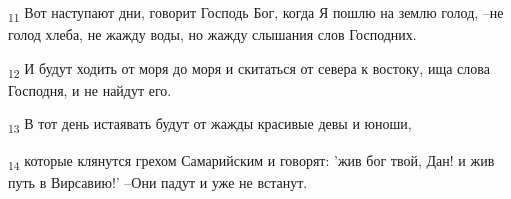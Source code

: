 \begin{tcolorbox}
\textsubscript{11} Вот наступают дни, говорит Господь Бог, когда Я пошлю на землю голод, --не голод хлеба, не жажду воды, но жажду слышания слов Господних.
\end{tcolorbox}
\begin{tcolorbox}
\textsubscript{12} И будут ходить от моря до моря и скитаться от севера к востоку, ища слова Господня, и не найдут его.
\end{tcolorbox}
\begin{tcolorbox}
\textsubscript{13} В тот день истаявать будут от жажды красивые девы и юноши,
\end{tcolorbox}
\begin{tcolorbox}
\textsubscript{14} которые клянутся грехом Самарийским и говорят: 'жив бог твой, Дан! и жив путь в Вирсавию!' --Они падут и уже не встанут.
\end{tcolorbox}
